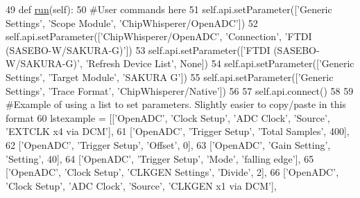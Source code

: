 \begin{DoxyCode}
49     \textcolor{keyword}{def }\hyperlink{classsoftware_1_1chipwhisperer_1_1capture_1_1scripts_1_1sakurag-aes_1_1UserScript_a4f9d3ac9280c0e6980ceb80aba9e8699}{run}(self):
50         \textcolor{comment}{#User commands here}
51         self.api.setParameter([\textcolor{stringliteral}{'Generic Settings'}, \textcolor{stringliteral}{'Scope Module'}, \textcolor{stringliteral}{'ChipWhisperer/OpenADC'}])
52         self.api.setParameter([\textcolor{stringliteral}{'ChipWhisperer/OpenADC'}, \textcolor{stringliteral}{'Connection'}, \textcolor{stringliteral}{'FTDI (SASEBO-W/SAKURA-G)'}])
53         self.api.setParameter([\textcolor{stringliteral}{'FTDI (SASEBO-W/SAKURA-G)'}, \textcolor{stringliteral}{'Refresh Device List'}, \textcolor{keywordtype}{None}])
54         self.api.setParameter([\textcolor{stringliteral}{'Generic Settings'}, \textcolor{stringliteral}{'Target Module'}, \textcolor{stringliteral}{'SAKURA G'}])
55         self.api.setParameter([\textcolor{stringliteral}{'Generic Settings'}, \textcolor{stringliteral}{'Trace Format'}, \textcolor{stringliteral}{'ChipWhisperer/Native'}])
56 
57         self.api.connect()
58         
59         \textcolor{comment}{#Example of using a list to set parameters. Slightly easier to copy/paste in this format}
60         lstexample = [[\textcolor{stringliteral}{'OpenADC'}, \textcolor{stringliteral}{'Clock Setup'}, \textcolor{stringliteral}{'ADC Clock'}, \textcolor{stringliteral}{'Source'}, \textcolor{stringliteral}{'EXTCLK x4 via DCM'}],
61                       [\textcolor{stringliteral}{'OpenADC'}, \textcolor{stringliteral}{'Trigger Setup'}, \textcolor{stringliteral}{'Total Samples'}, 400],
62                       [\textcolor{stringliteral}{'OpenADC'}, \textcolor{stringliteral}{'Trigger Setup'}, \textcolor{stringliteral}{'Offset'}, 0],
63                       [\textcolor{stringliteral}{'OpenADC'}, \textcolor{stringliteral}{'Gain Setting'}, \textcolor{stringliteral}{'Setting'}, 40],
64                       [\textcolor{stringliteral}{'OpenADC'}, \textcolor{stringliteral}{'Trigger Setup'}, \textcolor{stringliteral}{'Mode'}, \textcolor{stringliteral}{'falling edge'}],
65                       [\textcolor{stringliteral}{'OpenADC'}, \textcolor{stringliteral}{'Clock Setup'}, \textcolor{stringliteral}{'CLKGEN Settings'}, \textcolor{stringliteral}{'Divide'}, 2],
66                       [\textcolor{stringliteral}{'OpenADC'}, \textcolor{stringliteral}{'Clock Setup'}, \textcolor{stringliteral}{'ADC Clock'}, \textcolor{stringliteral}{'Source'}, \textcolor{stringliteral}{'CLKGEN x1 via DCM'}],

\end{DoxyCode}
